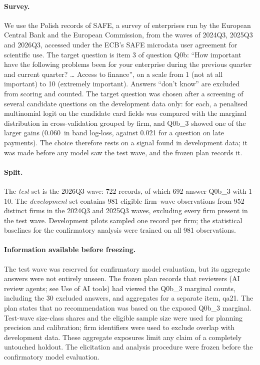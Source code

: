 \documentclass[11pt]{article}
\newcommand{\nats}{\,\text{nats}}
\begin{document}
\paragraph{Survey.} We use the Polish records of SAFE, a survey of enterprises run by the European Central Bank and
the European Commission, from the waves of 2024Q3, 2025Q3 and 2026Q3, accessed under the ECB's SAFE microdata user
agreement for scientific use. The target question is item 3 of question Q0b: ``How important have the following
problems been for your enterprise during the previous quarter and current quarter? \ldots{} Access to finance'', on a
scale from 1 (not at all important) to 10 (extremely important). Answers ``don't know'' are excluded from scoring and
counted. The target question was chosen after a screening of several candidate questions on the development data only:
for each, a penalised multinomial logit on the candidate card fields was compared with the marginal distribution in
cross-validation grouped by firm, and Q0b\_3 showed one of the larger gains (0.060\nats{} in band log-loss, against
0.021 for a question on late payments). The choice therefore rests on a signal found in development data; it was made
before any model saw the test wave, and the frozen plan records it.

\paragraph{Split.} The \emph{test} set is the 2026Q3 wave: 722 records, of which 692 answer Q0b\_3 with 1--10. The
\emph{development} set contains 981 eligible firm--wave observations from 952 distinct firms in the 2024Q3 and
2025Q3 waves, excluding every firm present in the test wave. Development pilots sampled one record per firm;
the statistical baselines for the confirmatory analysis were trained on all 981 observations.

\paragraph{Information available before freezing.} The test wave was reserved for confirmatory model evaluation,
but its aggregate answers were not entirely unseen. The frozen plan records that reviewers (AI review agents; see Use of AI tools) had viewed the Q0b\_3
marginal counts, including the 30 excluded answers, and aggregates for a separate item, qa21. The plan states that
no recommendation was based on the exposed Q0b\_3 marginal. Test-wave size-class shares and the eligible sample size
were used for planning precision and calibration; firm identifiers were used to exclude overlap with development
data. These aggregate exposures limit any claim of a completely untouched holdout. The elicitation and analysis
procedure were frozen before the confirmatory model evaluation.
\end{document}
